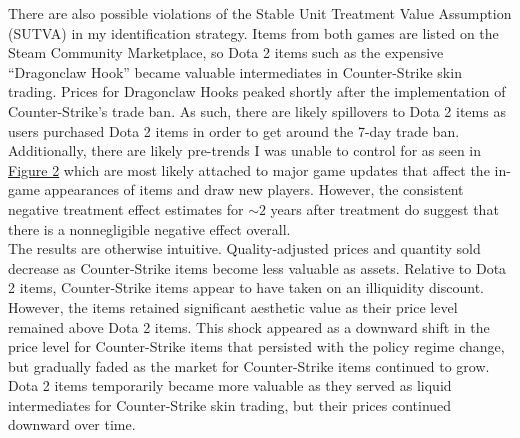 \documentclass[12pt,letterpaper]{article}
\begin{document}
There are also possible violations of the Stable Unit Treatment Value Assumption (SUTVA) in my identification strategy. Items from both games are listed on the Steam Community Marketplace, so Dota 2 items such as the expensive ``Dragonclaw Hook'' became valuable intermediates in Counter-Strike skin trading. Prices for Dragonclaw Hooks peaked shortly after the implementation of Counter-Strike's trade ban. As such, there are likely spillovers to Dota 2 items as users purchased Dota 2 items in order to get around the 7-day trade ban. Additionally, there are likely pre-trends I was unable to control for as seen in \hyperref[fig:event_study]{Figure 2} which are most likely attached to major game updates that affect the in-game appearances of items and draw new players. However, the consistent negative treatment effect estimates for \(\sim 2\) years after treatment do suggest that there is a nonnegligible negative effect overall. \\

The results are otherwise intuitive. Quality-adjusted prices and quantity sold decrease as Counter-Strike items become less valuable as assets. Relative to Dota 2 items, Counter-Strike items appear to have taken on an illiquidity discount. However, the items retained significant aesthetic value as their price level remained above Dota 2 items. This shock appeared as a downward shift in the price level for Counter-Strike items that persisted with the policy regime change, but gradually faded as the market for Counter-Strike items continued to grow. Dota 2 items temporarily became more valuable as they served as liquid intermediates for Counter-Strike skin trading, but their prices continued downward over time. \\ 
\end{document}
